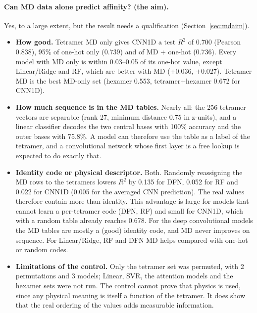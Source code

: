 \documentclass[11pt,a4paper]{article}
\begin{document}
\paragraph{Can MD data alone predict affinity? (the aim).} Yes, to a large extent, but the result needs a qualification (Section~\ref{sec:mdaim}).
\begin{itemize}
\item \textbf{How good.} Tetramer MD only gives CNN1D a test $R^2$ of 0.700 (Pearson 0.838), 95\% of one-hot only (0.739) and of MD + one-hot (0.736). Every model with MD only is within 0.03--0.05 of its one-hot value, except Linear/Ridge and RF, which are better with MD ($+0.036$, $+0.027$). Tetramer MD is the best MD-only set (hexamer 0.553, tetramer+hexamer 0.672 for CNN1D).
\item \textbf{How much sequence is in the MD tables.} Nearly all: the 256 tetramer vectors are separable (rank 27, minimum distance 0.75 in z-units), and a linear classifier decodes the two central bases with 100\% accuracy and the outer bases with 75.8\%. A model can therefore use the table as a label of the tetramer, and a convolutional network whose first layer is a free lookup is expected to do exactly that.
\item \textbf{Identity code or physical descriptor.} Both. Randomly reassigning the MD rows to the tetramers lowers $R^2$ by 0.135 for DFN, 0.052 for RF and 0.022 for CNN1D (0.005 for the averaged CNN prediction). The real values therefore contain more than identity. This advantage is large for models that cannot learn a per-tetramer code (DFN, RF) and small for CNN1D, which with a random table already reaches 0.678. For the deep convolutional models the MD tables are mostly a (good) identity code, and MD never improves on sequence. For Linear/Ridge, RF and DFN MD helps compared with one-hot or random codes.
\item \textbf{Limitations of the control.} Only the tetramer set was permuted, with 2 permutations and 3 models; Linear, SVR, the attention models and the hexamer sets were not run. The control cannot prove that physics is used, since any physical meaning is itself a function of the tetramer. It does show that the real ordering of the values adds measurable information.
\end{itemize}
\end{document}
